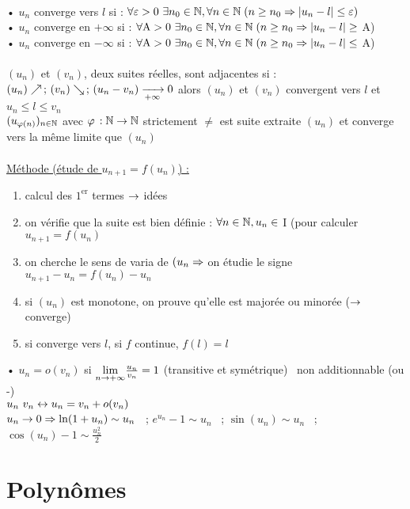 \documentclass[12 pt]{book}
\begin{document}
\begin{flushleft}
\begin{doublespace}
	\text{ }\\
	• $u_n$ converge vers $l$ si : $\forall \varepsilon > 0 \ \exists n_0\in \mathbb{N} , \forall n\in \mathbb{N} \; (n\geq n_0 \Rightarrow |u_n - l| \leq \varepsilon )$\\
	• $u_n$ converge en $+\infty$ si : $\forall \text{A} > 0 \ \exists n_0\in \mathbb{N} , \forall n\in \mathbb{N} \; (n\geq n_0 \Rightarrow |u_n - l| \geq$ A)\\
	• $u_n$ converge en $-\infty$ si : $\forall \text{A} > 0 \ \exists n_0\in \mathbb{N} , \forall n\in \mathbb{N} \; (n\geq n_0 \Rightarrow |u_n - l| \leq$ A)\\
	\text{ }\\
	$(u_n)$ et $(v_n)$, deux suites réelles, sont adjacentes si : $(u_n) \nearrow \, ; \, (v_n) \searrow \, ; \, (u_n - v_n) \xrightarrow[+\infty]{} 0$ alors $(u_n)$ et $(v_n)$ convergent vers $l$ et $u_n\leq l \leq v_n$\\
	$(u_{\varphi (n)} )_{n\in \mathbb{N}}$ avec $\varphi \, : \mathbb{N} \rightarrow \mathbb{N}$ strictement $\ne$ est suite extraite $(u_n)$ et converge vers la même limite que $(u_n)$\\
	\text{ }\\
	\underline{Méthode (étude de $u_{n+1} = f(u_n)$) :}\\
	\begin{enumerate}
		\item calcul des $1^{\text{er}}$ termes $\rightarrow$ idées
		\item on vérifie que la suite est bien définie : $\forall n\in \mathbb{N} , u_n\in$ I (pour calculer $u_{n+1} = f(u_n)$
		\item on cherche le sens de varia de $(u_n \Rightarrow$ on étudie le signe $u_{n+1} - u_n = f(u_n) - u_n$
		\item si $(u_n)$ est monotone, on prouve qu'elle est majorée ou minorée ($\rightarrow$ converge)
		\item si converge vers $l$, si $f$ continue, $f(l) = l$
	\end{enumerate}
	• $u_n = o (v_n)$ si $\underset{n \rightarrow +\infty}{\text{lim}} \frac{u_n}{v_n} = 1$ (transitive et symétrique) \ non additionnable (ou -)\\
	$u_n ~ v_n \leftrightarrow u_n = v_n + o (v_n)$\\
	$u_n \rightarrow 0 \Rightarrow \ln(1+u_n) \sim u_n$ \ ; $e^{u_n} - 1 \sim u_n$ \ ; $\sin(u_n) \sim u_n$ \ ; $\cos(u_n) - 1 \sim \frac{u_n^2}{2}$\\

\end{doublespace}
\end{flushleft}

\section*{Polynômes}
\end{document}
